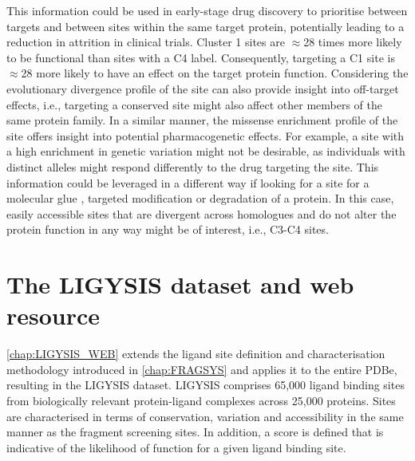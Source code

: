 
This information could be used in early-stage drug discovery to prioritise between targets and between sites within the same target protein, potentially leading to a reduction in attrition in clinical trials. Cluster 1 sites are $\approx$28 times more likely to be functional than sites with a C4 label. Consequently, targeting a C1 site is $\approx$28 more likely to have an effect on the target protein function. Considering the evolutionary divergence profile of the site can also provide insight into off-target effects, i.e., targeting a conserved site might also affect other members of the same protein family. In a similar manner, the missense enrichment profile of the site offers insight into potential pharmacogenetic effects. For example, a site with a high enrichment in genetic variation might not be desirable, as individuals with distinct alleles might respond differently to the drug targeting the site. This information could be leveraged in a different way if looking for a site for a molecular glue \cite{SCHREIBER_2021_GLUES}, targeted modification \cite{BREWER_2024_ATLAS, BREWER_2024_SMAD3, ZHAO_2024_TFEB} or degradation \cite{ZENGERLE_2015_BRD4, GADD_2017_PROTAC} of a protein. In this case, easily accessible sites that are divergent across homologues and do not alter the protein function in any way might be of interest, i.e., C3-C4 sites.

\section{The LIGYSIS dataset and web resource}

\autoref{chap:LIGYSIS_WEB} extends the ligand site definition and characterisation methodology introduced in \autoref{chap:FRAGSYS} and applies it to the entire PDBe, resulting in the LIGYSIS dataset. LIGYSIS comprises 65,000 ligand binding sites from biologically relevant protein-ligand complexes across 25,000 proteins. Sites are characterised in terms of conservation, variation and accessibility in the same manner as the fragment screening sites. In addition, a score is defined that is indicative of the likelihood of function for a given ligand binding site. %

